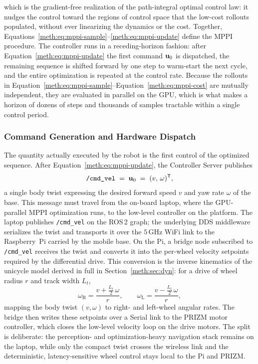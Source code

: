 which is the gradient-free realization of the path-integral optimal control law: it nudges the
control toward the regions of control space that the low-cost rollouts populated, without ever
linearizing the dynamics or the cost. Together, Equations~\eqref{meth:eq:mppi-sample}--\eqref{meth:eq:mppi-update} define the MPPI procedure. The
controller runs in a receding-horizon fashion: after Equation~\eqref{meth:eq:mppi-update} the first command
$\mathbf{u}_0$ is dispatched, the remaining sequence is shifted forward by one step to warm-start the
next cycle, and the entire optimization is repeated at the control rate. Because the rollouts in
Equation~\eqref{meth:eq:mppi-sample}--Equation~\eqref{meth:eq:mppi-cost} are mutually independent, they are evaluated in
parallel on the GPU, which is what makes a horizon of dozens of steps and thousands of samples
tractable within a single control period.



\subsubsection{Command Generation and Hardware Dispatch}\label{meth:sec:nav-dispatch}

The quantity actually executed by the robot is the first control of the optimized sequence. After
Equation~\eqref{meth:eq:mppi-update}, the Controller Server publishes
\begin{equation}\label{meth:eq:cmd-vel}
  \texttt{/cmd\_vel} \;=\; \mathbf{u}_0 \;=\; (v,\,\omega)^{\mathsf{T}},
\end{equation}
a single body twist expressing the desired forward speed $v$ and yaw rate $\omega$ of the base.
This message must travel from the on-board laptop, where the GPU-parallel MPPI optimization runs,
to the low-level controller on the platform. The laptop publishes \texttt{/cmd\_vel} on the ROS\,2
graph; the underlying DDS middleware serializes the twist and transports it over the
\ensuremath{5\,\mathrm{GHz}} WiFi link to the Raspberry~Pi carried by the mobile base. On the Pi, a bridge
node subscribed to \texttt{/cmd\_vel} receives the twist and converts it into the per-wheel
velocity setpoints required by the differential drive. This conversion is the inverse kinematics
of the unicycle model derived in full in Section~\ref{meth:sec:dyn}: for a drive of wheel radius $r$ and track
width $L_t$,
\begin{equation}\label{meth:eq:wheel-ik}
  \omega_{\mathrm{R}} = \frac{v + \tfrac{L_t}{2}\,\omega}{r},
  \qquad
  \omega_{\mathrm{L}} = \frac{v - \tfrac{L_t}{2}\,\omega}{r},
\end{equation}
mapping the body twist $(v,\omega)$ to right- and left-wheel angular rates. The bridge then writes
these setpoints over a Serial link to the PRIZM motor controller, which closes the low-level
velocity loop on the drive motors. The split is deliberate: the perception- and optimization-heavy
navigation stack remains on the laptop, while only the compact twist crosses the wireless link and
the deterministic, latency-sensitive wheel control stays local to the Pi and PRIZM.

